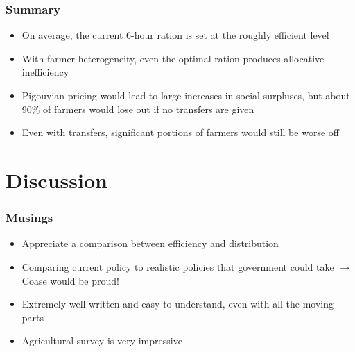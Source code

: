 \documentclass[aspectratio=169]{beamer}
\begin{document}
\begin{frame}
    \frametitle{Summary}
    \begin{itemize}
        \item On average, the current 6-hour ration is set at the roughly efficient level
        \item With farmer heterogeneity, even the optimal ration produces allocative inefficiency
        \item Pigouvian pricing would lead to large increases in social surpluses, but about 90\% of farmers would lose out if no transfers are given 
        \item Even with transfers, significant portions of farmers would still be worse off 
    \end{itemize}
\end{frame}

\section{Discussion} 
\begin{frame}
    \frametitle{Musings}
    \begin{itemize}
        \item Appreciate a comparison between efficiency and distribution
        \item Comparing current policy to realistic policies that government could take $\rightarrow$ Coase would be proud!
        \item Extremely well written and easy to understand, even with all the moving parts 
        \item Agricultural survey is very impressive
    \end{itemize}
\end{frame}
\end{document}
